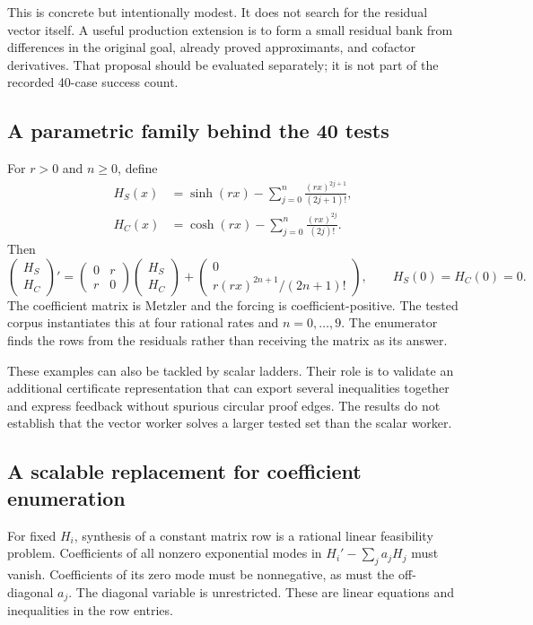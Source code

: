 This is concrete but intentionally modest. It does not search for the residual vector itself. A useful production extension is to form a small residual bank from differences in the original goal, already proved approximants, and cofactor derivatives. That proposal should be evaluated separately; it is not part of the recorded 40-case success count.

\subsection{A parametric family behind the 40 tests}

For $r>0$ and $n\ge0$, define
\begin{align*}
 H_S(x)&=\sinh(rx)-\sum_{j=0}^{n}\frac{(rx)^{2j+1}}{(2j+1)!},\\
 H_C(x)&=\cosh(rx)-\sum_{j=0}^{n}\frac{(rx)^{2j}}{(2j)!}.
\end{align*}
Then
\[
 \begin{pmatrix}H_S\\H_C\end{pmatrix}'
 =\begin{pmatrix}0&r\\r&0\end{pmatrix}
  \begin{pmatrix}H_S\\H_C\end{pmatrix}
 +\begin{pmatrix}0\\ r(rx)^{2n+1}/(2n+1)!\end{pmatrix},
 \qquad H_S(0)=H_C(0)=0.
\]
The coefficient matrix is Metzler and the forcing is coefficient-positive. The tested corpus instantiates this at four rational rates and $n=0,\ldots,9$. The enumerator finds the rows from the residuals rather than receiving the matrix as its answer.

These examples can also be tackled by scalar ladders. Their role is to validate an additional certificate representation that can export several inequalities together and express feedback without spurious circular proof edges. The results do not establish that the vector worker solves a larger tested set than the scalar worker.

\subsection{A scalable replacement for coefficient enumeration}

For fixed $H_i$, synthesis of a constant matrix row is a rational linear feasibility problem. Coefficients of all nonzero exponential modes in $H_i'-\sum_j a_jH_j$ must vanish. Coefficients of its zero mode must be nonnegative, as must the off-diagonal $a_j$. The diagonal variable is unrestricted. These are linear equations and inequalities in the row entries.

